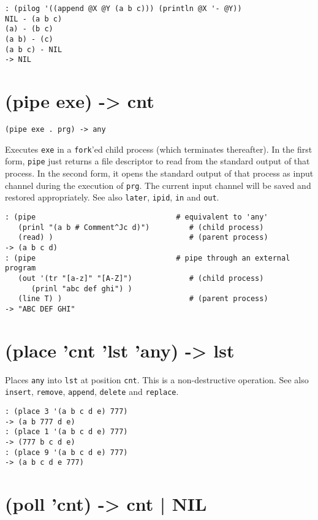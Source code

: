 {{{{{{{\begin{verbatim}
: (pilog '((append @X @Y (a b c))) (println @X '- @Y))
NIL - (a b c)
(a) - (b c)
(a b) - (c)
(a b c) - NIL
-> NIL
\end{verbatim}

 
\section{(pipe exe) -> cnt}
\label{sec-8-1-16-18}


\texttt{(pipe exe . prg) -> any}

Executes \texttt{exe} in a \texttt{fork}'ed child process (which terminates
thereafter). In the first form, \texttt{pipe} just returns a file descriptor to
read from the standard output of that process. In the second form, it
opens the standard output of that process as input channel during the
execution of \texttt{prg}. The current input channel will be saved and restored
appropriately. See also \texttt{later}, \texttt{ipid}, \texttt{in} and \texttt{out}.


\begin{verbatim}
: (pipe                                # equivalent to 'any'
   (prinl "(a b # Comment^Jc d)")         # (child process)
   (read) )                               # (parent process)
-> (a b c d)
: (pipe                                # pipe through an external program
   (out '(tr "[a-z]" "[A-Z]")             # (child process)
      (prinl "abc def ghi") )
   (line T) )                             # (parent process)
-> "ABC DEF GHI"
\end{verbatim}

 
\section{(place 'cnt 'lst 'any) -> lst}
\label{sec-8-1-16-19}


Places \texttt{any} into \texttt{lst} at position \texttt{cnt}. This is a non-destructive
operation. See also \texttt{insert}, \texttt{remove}, \texttt{append}, \texttt{delete} and
\texttt{replace}.


\begin{verbatim}
: (place 3 '(a b c d e) 777)
-> (a b 777 d e)
: (place 1 '(a b c d e) 777)
-> (777 b c d e)
: (place 9 '(a b c d e) 777)
-> (a b c d e 777)
\end{verbatim}

 
\section{(poll 'cnt) -> cnt | NIL}
\label{sec-8-1-16-20}


}}}}}}}
